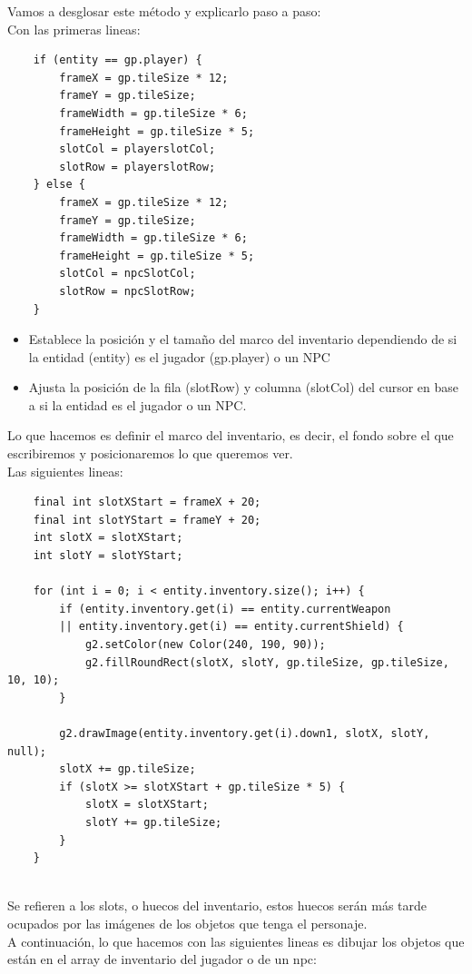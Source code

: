 \documentclass[a4paper]{article}
\begin{document}
Vamos a desglosar este método y explicarlo paso a paso:\\
Con las primeras lineas:
\begin{lstlisting}
    if (entity == gp.player) {
        frameX = gp.tileSize * 12;
        frameY = gp.tileSize;
        frameWidth = gp.tileSize * 6;
        frameHeight = gp.tileSize * 5;
        slotCol = playerslotCol;
        slotRow = playerslotRow;
    } else {
        frameX = gp.tileSize * 12;
        frameY = gp.tileSize;
        frameWidth = gp.tileSize * 6;
        frameHeight = gp.tileSize * 5;
        slotCol = npcSlotCol;
        slotRow = npcSlotRow;
    }    
\end{lstlisting}
\begin{itemize}
    \item Establece la posición y el tamaño del marco del inventario dependiendo de si la entidad (entity) es el jugador (gp.player) o un NPC
    \item Ajusta la posición de la fila (slotRow) y columna (slotCol) del cursor en base a si la entidad es el jugador o un NPC.
\end{itemize}
Lo que hacemos es definir el marco del inventario, es decir, el fondo sobre el que escribiremos y posicionaremos lo que queremos ver.\\
Las siguientes lineas:
\begin{lstlisting}
    final int slotXStart = frameX + 20;
    final int slotYStart = frameY + 20;
    int slotX = slotXStart;
    int slotY = slotYStart;
    
    for (int i = 0; i < entity.inventory.size(); i++) {
        if (entity.inventory.get(i) == entity.currentWeapon 
        || entity.inventory.get(i) == entity.currentShield) {
            g2.setColor(new Color(240, 190, 90));
            g2.fillRoundRect(slotX, slotY, gp.tileSize, gp.tileSize, 10, 10);
        }
    
        g2.drawImage(entity.inventory.get(i).down1, slotX, slotY, null);
        slotX += gp.tileSize;
        if (slotX >= slotXStart + gp.tileSize * 5) {
            slotX = slotXStart;
            slotY += gp.tileSize;
        }
    }
    
\end{lstlisting}
Se refieren a los slots, o huecos del inventario, estos huecos serán más tarde ocupados por las imágenes de los objetos que tenga el personaje.\\
A continuación, lo que hacemos con las siguientes lineas es dibujar los objetos que están en el array de inventario del jugador o de un npc:
\end{document}

